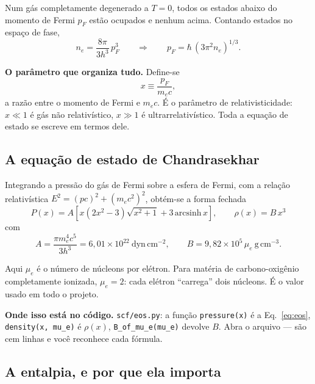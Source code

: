 \documentclass[11pt,a4paper]{article}
\newcommand{\code}[1]{\texttt{\small #1}}
\begin{document}
Num gás completamente degenerado a $T=0$, todos os estados abaixo do momento de
Fermi $p_F$ estão ocupados e nenhum acima. Contando estados no espaço de fase,
\begin{equation}
n_e = \frac{8\pi}{3h^3}\,p_F^3
\qquad\Longrightarrow\qquad
p_F = \hbar\,(3\pi^2 n_e)^{1/3}.
\end{equation}

\begin{caixa}
\textbf{O parâmetro que organiza tudo.} Define-se
\begin{equation}
x \equiv \frac{p_F}{m_e c},
\end{equation}
a razão entre o momento de Fermi e $m_e c$. É o parâmetro de
relativisticidade: $x \ll 1$ é gás não relativístico, $x \gg 1$ é
ultrarrelativístico. Toda a equação de estado se escreve em termos dele.
\end{caixa}

\subsection{A equação de estado de Chandrasekhar}

Integrando a pressão do gás de Fermi sobre a esfera de Fermi, com a relação
relativística $E^2 = (pc)^2 + (m_ec^2)^2$, obtém-se a forma fechada
\begin{equation}
\boxed{\;
P(x) = A\left[x(2x^2-3)\sqrt{x^2+1} + 3\,\mathrm{arcsinh}\,x\right],
\qquad
\rho(x) = B\,x^3 \;}
\label{eq:eos}
\end{equation}
com
\begin{equation}
A = \frac{\pi m_e^4 c^5}{3h^3} = 6{,}01\times10^{22}\ \mathrm{dyn\,cm^{-2}},
\qquad
B = 9{,}82\times10^5\,\mu_e\ \mathrm{g\,cm^{-3}} .
\end{equation}

Aqui $\mu_e$ é o número de núcleons por elétron. Para matéria de carbono-oxigênio
completamente ionizada, $\mu_e = 2$: cada elétron ``carrega'' dois núcleons. É o
valor usado em todo o projeto.

\begin{caixa}
\textbf{Onde isso está no código.} \code{scf/eos.py}: a função
\code{pressure(x)} é a Eq.~\eqref{eq:eos}, \code{density(x, mu\_e)} é
$\rho(x)$, \code{B\_of\_mu\_e(mu\_e)} devolve $B$. Abra o arquivo --- são
cem linhas e você reconhece cada fórmula.
\end{caixa}

\subsection{A entalpia, e por que ela importa}
\end{document}
